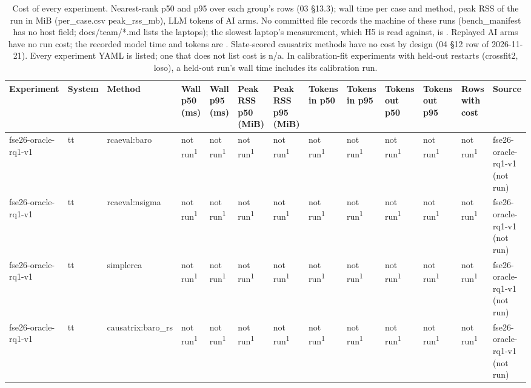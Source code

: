 \begin{table}[t]
\centering
\caption{Cost of every experiment. Nearest-rank p50 and p95 over each group's rows (03 \S{}13.3); wall time per case and method, peak RSS of the run in MiB (per\_case.csv peak\_rss\_mb), LLM tokens of AI arms. No committed file records the machine of these runs (bench\_manifest has no host field; docs/team/*.md lists the laptops); the slowest laptop's measurement, which H5 is read against, is . Replayed AI arms have no run cost; the recorded model time and tokens are . Slate-scored causatrix methods have no cost by design (04 \S{}12 row of 2026-11-21). Every experiment YAML is listed; one that does not list cost is n/a. In calibration-fit experiments with held-out restarts (crossfit2, loso), a held-out run's wall time includes its calibration run.}
\label{tab:a1-cost-all}
\small
\begin{tabular}{lllllllllllll}
\hline
Experiment & System & Method & Wall p50 (ms) & Wall p95 (ms) & Peak RSS p50 (MiB) & Peak RSS p95 (MiB) & Tokens in p50 & Tokens in p95 & Tokens out p50 & Tokens out p95 & Rows with cost & Source \\
\hline
fse26-oracle-rq1-v1 & tt & rcaeval:baro & not run\textsuperscript{1} & not run\textsuperscript{1} & not run\textsuperscript{1} & not run\textsuperscript{1} & not run\textsuperscript{1} & not run\textsuperscript{1} & not run\textsuperscript{1} & not run\textsuperscript{1} & not run\textsuperscript{1} & fse26-oracle-rq1-v1 (not run) \\
fse26-oracle-rq1-v1 & tt & rcaeval:nsigma & not run\textsuperscript{1} & not run\textsuperscript{1} & not run\textsuperscript{1} & not run\textsuperscript{1} & not run\textsuperscript{1} & not run\textsuperscript{1} & not run\textsuperscript{1} & not run\textsuperscript{1} & not run\textsuperscript{1} & fse26-oracle-rq1-v1 (not run) \\
fse26-oracle-rq1-v1 & tt & simplerca & not run\textsuperscript{1} & not run\textsuperscript{1} & not run\textsuperscript{1} & not run\textsuperscript{1} & not run\textsuperscript{1} & not run\textsuperscript{1} & not run\textsuperscript{1} & not run\textsuperscript{1} & not run\textsuperscript{1} & fse26-oracle-rq1-v1 (not run) \\
fse26-oracle-rq1-v1 & tt & causatrix:baro\_rs & not run\textsuperscript{1} & not run\textsuperscript{1} & not run\textsuperscript{1} & not run\textsuperscript{1} & not run\textsuperscript{1} & not run\textsuperscript{1} & not run\textsuperscript{1} & not run\textsuperscript{1} & not run\textsuperscript{1} & fse26-oracle-rq1-v1 (not run) \\

\end{tabular}
\end{table}
